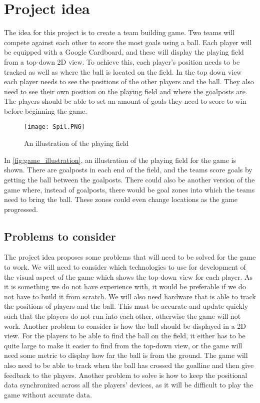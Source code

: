 \section{Project idea}
The idea for this project is to create a team building game.
Two teams will compete against each other to score the most goals using a ball. 
Each player will be equipped with a Google Cardboard, and these will display the playing field from a top-down 2D view. 
To achieve this, each player's position needs to be tracked as well as where the ball is located on the field.
In the top down view each player needs to see the positions of the other players and the ball.
They also need to see their own position on the playing field and where the goalposts are.
The players should be able to set an amount of goals they need to score to win before beginning the game. 
\begin{figure}[H]
    \centering
    \texttt{[image: Spil.PNG]}
    \caption{An illustration of the playing field}
    \label{fig:game_illustration}
\end{figure}
In \autoref{fig:game_illustration}, an illustration of the playing field for the game is shown.
There are goalposts in each end of the field, and the teams score goals by getting the ball between the goalposts.
There could also be another version of the game where, instead of goalposts, there would be goal zones into which the teams need to bring the ball.
These zones could even change locations as the game progressed.
\subsection{Problems to consider}
The project idea proposes some problems that will need to be solved for the game to work.
We will need to consider which technologies to use for development of the visual aspect of the game which shows the top-down view for each player. 
As it is something we do not have experience with, it would be preferable if we do not have to build it from scratch.
We will also need hardware that is able to track the positions of players and the ball.
This must be accurate and update quickly such that the players do not run into each other, otherwise the game will not work.
Another problem to consider is how the ball should be displayed in a 2D view.
For the players to be able to find the ball on the field, it either has to be quite large to make it easier to find from the top-down view, or the game will need some metric to display how far the ball is from the ground.
The game will also need to be able to track when the ball has crossed the goalline and then give feedback to the players.
Another problem to solve is how to keep the positional data synchronized across all the players' devices, as it will be difficult to play the game without accurate data.
